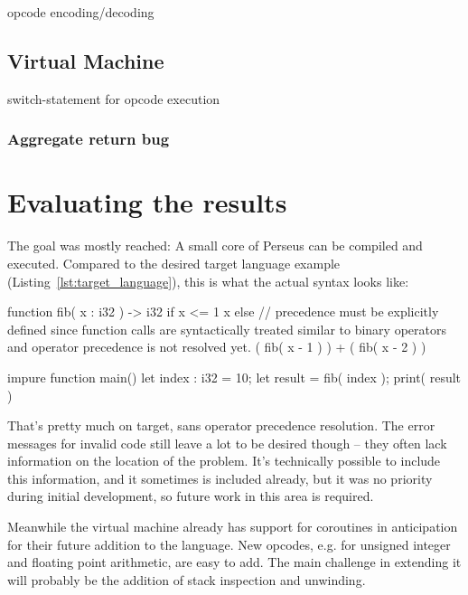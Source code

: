         opcode encoding/decoding
        
    \section{Virtual Machine}
        
        switch-statement for opcode execution
        
        \subsection{Aggregate return bug}


\chapter{Evaluating the results}

The goal was mostly reached: A small core of Perseus can be compiled and executed. Compared to the desired target language example (Listing~\ref{lst:target_language}), this is what the actual syntax looks like:

\begin{perseuslisting}[caption={Actual resulting language example},label={lst:result_language}]
function fib( x : i32 ) -> i32
    if x <= 1
        x
    else
    	// precedence must be explicitly defined since function calls are syntactically treated similar to binary operators and operator precedence is not resolved yet.
        ( fib( x - 1 ) ) + ( fib( x - 2 ) )

impure function main()
{
	let index : i32 = 10;
	let result = fib( index );
	print( result )
}
\end{perseuslisting}

That's pretty much on target, sans operator precedence resolution. The error messages for invalid code still leave a lot to be desired though -- they often lack information on the location of the problem. It's technically possible to include this information, and it sometimes is included already, but it was no priority during initial development, so future work in this area is required.

Meanwhile the virtual machine already has support for coroutines in anticipation for their future addition to the language. New opcodes, e.g. for unsigned integer and floating point arithmetic, are easy to add. The main challenge in extending it will probably be the addition of stack inspection and unwinding.

